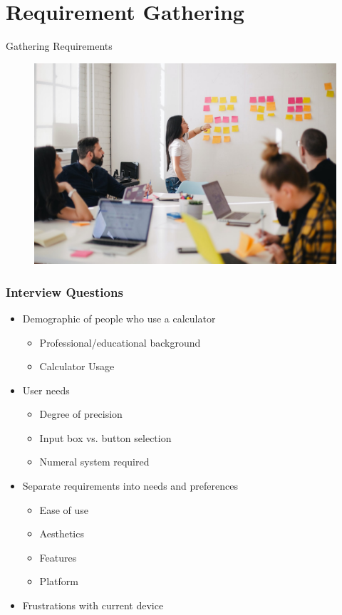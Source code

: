 \documentclass{beamer}
\begin{document}
\section{Requirement Gathering}

\begin{frame}
\begin{center}
{\Huge Gathering Requirements}
\begin{figure}
\includegraphics[scale=0.2]{Brainstorm}\footnotemark[2]
\end{figure}
\end{center}
\end{frame}


\begin{frame}
\frametitle{Interview Questions}
\begin{itemize}
 \item Demographic of people who use a calculator
  \begin{itemize}
   \item Professional/educational background
   \item Calculator Usage
  \end{itemize}
 \item User needs
  \begin{itemize}
   \item Degree of precision
   \item Input box vs. button selection
   \item Numeral system required
  \end{itemize}
 \item Separate requirements into needs and preferences
  \begin{itemize}
   \item Ease of use
   \item Aesthetics
   \item Features
   \item Platform
  \end{itemize}
   \item Frustrations with current device
\end{itemize}
\end{frame}
\end{document}
